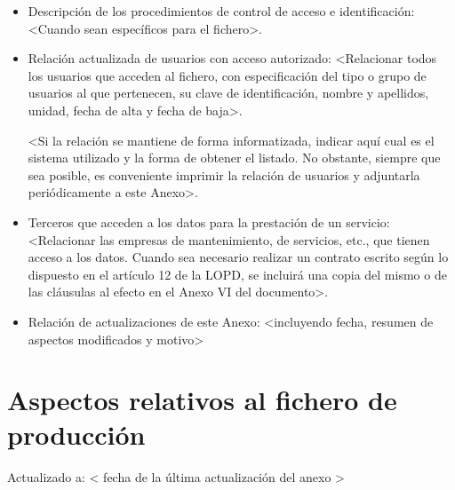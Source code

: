 \documentclass[a4paper,11pt,bibtotoc,noliststotoc]{scrbook}
\begin{document}
\begin{itemize}
\item Descripción de los procedimientos de control de acceso e identificación: <Cuando sean específicos para el fichero>.

\item Relación actualizada de usuarios con acceso autorizado: <Relacionar todos los usuarios que acceden al fichero, con especificación del tipo o grupo de usuarios al que pertenecen, su clave de identificación, nombre y apellidos, unidad, fecha de alta y fecha de baja>.

<Si la relación se mantiene de forma informatizada, indicar aquí cual es el sistema utilizado y la forma de obtener el listado. No obstante, siempre que sea posible, es conveniente imprimir la relación de usuarios y adjuntarla periódicamente a este Anexo>.

\item Terceros que acceden a los datos para la prestación de un servicio: <Relacionar las empresas de mantenimiento, de servicios, etc., que tienen acceso a los datos. Cuando sea necesario realizar un contrato escrito según lo dispuesto en el artículo 12 de la LOPD, se incluirá una copia del mismo o de las cláusulas al efecto en el Anexo VI del documento>.

\item Relación de actualizaciones de este Anexo: <incluyendo fecha, resumen de aspectos modificados y motivo>

\end{itemize}








\section{Aspectos relativos al fichero de producción}


Actualizado a: < fecha de la última actualización del anexo >
\end{document}
